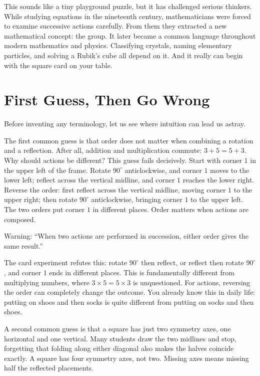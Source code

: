 This sounds like a tiny playground puzzle, but it has challenged serious thinkers. While studying equations in the nineteenth century, mathematicians were forced to examine successive actions carefully. From them they extracted a new mathematical concept: the group. It later became a common language throughout modern mathematics and physics. Classifying crystals, naming elementary particles, and solving a Rubik's cube all depend on it. And it really can begin with the square card on your table.

\section{First Guess, Then Go Wrong}

Before inventing any terminology, let us see where intuition can lead us astray.

The first common guess is that order does not matter when combining a rotation and a reflection. After all, addition and multiplication commute: $3+5=5+3$. Why should actions be different? This guess fails decisively. Start with corner $1$ in the upper left of the frame. Rotate $90^\circ$ anticlockwise, and corner $1$ moves to the lower left; reflect across the vertical midline, and corner $1$ reaches the lower right. Reverse the order: first reflect across the vertical midline, moving corner $1$ to the upper right; then rotate $90^\circ$ anticlockwise, bringing corner $1$ to the upper left. The two orders put corner $1$ in different places. Order matters when actions are composed.

\begin{fanli}
Warning: ``When two actions are performed in succession, either order gives the same result.''

The card experiment refutes this: rotate $90^\circ$ then reflect, or reflect then rotate $90^\circ$, and corner $1$ ends in different places. This is fundamentally different from multiplying numbers, where $3\times5=5\times3$ is unquestioned. For actions, reversing the order can completely change the outcome. You already know this in daily life: putting on shoes and then socks is quite different from putting on socks and then shoes.
\end{fanli}

A second common guess is that a square has just two symmetry axes, one horizontal and one vertical. Many students draw the two midlines and stop, forgetting that folding along either diagonal also makes the halves coincide exactly. A square has four symmetry axes, not two. Missing axes means missing half the reflected placements.

